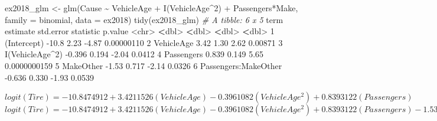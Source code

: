 \documentclass[
]{article}
\newenvironment{Shaded}{\begin{snugshade}}{\end{snugshade}}
\newcommand{\AttributeTok}[1]{\textcolor[rgb]{0.77,0.63,0.00}{#1}}
\newcommand{\CommentTok}[1]{\textcolor[rgb]{0.56,0.35,0.01}{\textit{#1}}}
\newcommand{\DecValTok}[1]{\textcolor[rgb]{0.00,0.00,0.81}{#1}}
\newcommand{\ErrorTok}[1]{\textcolor[rgb]{0.64,0.00,0.00}{\textbf{#1}}}
\newcommand{\FloatTok}[1]{\textcolor[rgb]{0.00,0.00,0.81}{#1}}
\newcommand{\FunctionTok}[1]{\textcolor[rgb]{0.00,0.00,0.00}{#1}}
\newcommand{\NormalTok}[1]{#1}
\newcommand{\OtherTok}[1]{\textcolor[rgb]{0.56,0.35,0.01}{#1}}
\newcommand{\SpecialCharTok}[1]{\textcolor[rgb]{0.00,0.00,0.00}{#1}}
\begin{document}
\begin{Shaded}
\begin{Highlighting}[]
\NormalTok{ex2018\_glm }\OtherTok{\textless{}{-}} \FunctionTok{glm}\NormalTok{(Cause }\SpecialCharTok{\textasciitilde{}}\NormalTok{ VehicleAge }\SpecialCharTok{+} \FunctionTok{I}\NormalTok{(VehicleAge}\SpecialCharTok{\^{}}\DecValTok{2}\NormalTok{) }\SpecialCharTok{+}\NormalTok{ Passengers}\SpecialCharTok{*}\NormalTok{Make, }\AttributeTok{family =}\NormalTok{ binomial, }\AttributeTok{data =}\NormalTok{ ex2018)}
\FunctionTok{tidy}\NormalTok{(ex2018\_glm)}
\CommentTok{\# A tibble: 6 x 5}
\NormalTok{  term                 estimate std.error statistic      p.value}
  \SpecialCharTok{\textless{}}\NormalTok{chr}\SpecialCharTok{\textgreater{}}                   \ErrorTok{\textless{}}\NormalTok{dbl}\SpecialCharTok{\textgreater{}}     \ErrorTok{\textless{}}\NormalTok{dbl}\SpecialCharTok{\textgreater{}}     \ErrorTok{\textless{}}\NormalTok{dbl}\SpecialCharTok{\textgreater{}}        \ErrorTok{\textless{}}\NormalTok{dbl}\SpecialCharTok{\textgreater{}}
\DecValTok{1}\NormalTok{ (Intercept)           }\SpecialCharTok{{-}}\FloatTok{10.8}       \FloatTok{2.23}      \SpecialCharTok{{-}}\FloatTok{4.87} \FloatTok{0.00000110}  
\DecValTok{2}\NormalTok{ VehicleAge              }\FloatTok{3.42}      \FloatTok{1.30}       \FloatTok{2.62} \FloatTok{0.00871}     
\DecValTok{3} \FunctionTok{I}\NormalTok{(VehicleAge}\SpecialCharTok{\^{}}\DecValTok{2}\NormalTok{)        }\SpecialCharTok{{-}}\FloatTok{0.396}     \FloatTok{0.194}     \SpecialCharTok{{-}}\FloatTok{2.04} \FloatTok{0.0412}      
\DecValTok{4}\NormalTok{ Passengers              }\FloatTok{0.839}     \FloatTok{0.149}      \FloatTok{5.65} \FloatTok{0.0000000159}
\DecValTok{5}\NormalTok{ MakeOther              }\SpecialCharTok{{-}}\FloatTok{1.53}      \FloatTok{0.717}     \SpecialCharTok{{-}}\FloatTok{2.14} \FloatTok{0.0326}      
\DecValTok{6}\NormalTok{ Passengers}\SpecialCharTok{:}\NormalTok{MakeOther   }\SpecialCharTok{{-}}\FloatTok{0.636}     \FloatTok{0.330}     \SpecialCharTok{{-}}\FloatTok{1.93} \FloatTok{0.0539}      
\end{Highlighting}
\end{Shaded}

\(logit(Tire) = -10.8474912 + 3.4211526(VehicleAge) - 0.3961082(VehicleAge^2) + 0.8393122(Passengers)\)
\newline
\(logit(Tire) = -10.8474912 + 3.4211526(VehicleAge) - 0.3961082(VehicleAge^2) + 0.8393122(Passengers) - 1.5321682(MakeOther) - 0.6359625(Passengers)(MakeOther)\)
\end{document}
